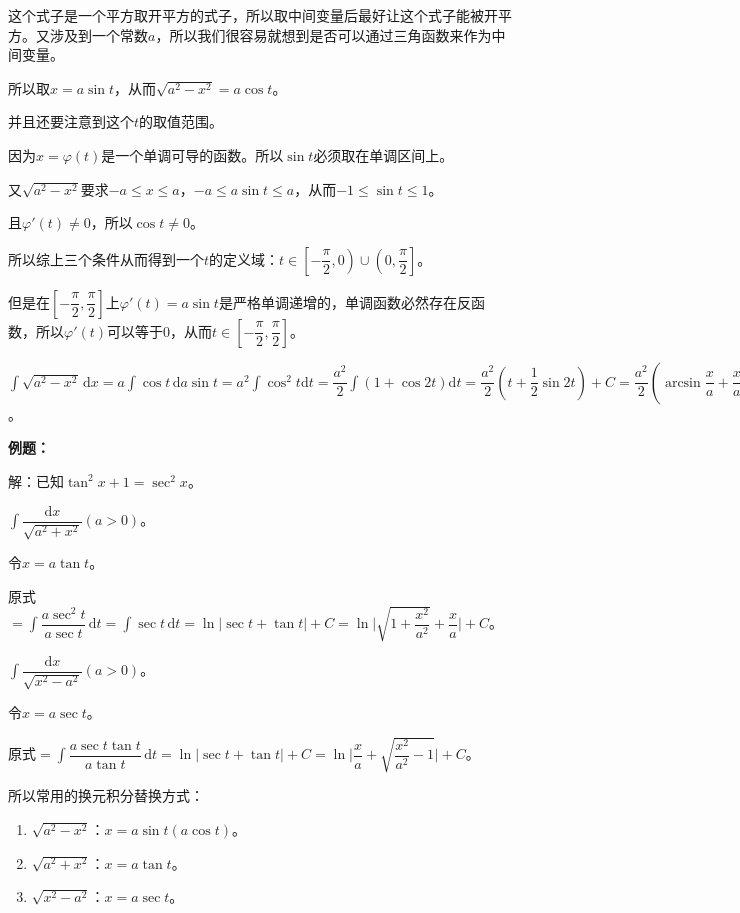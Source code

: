 \documentclass[UTF8, 12pt]{ctexart}
\begin{document}
        这个式子是一个平方取开平方的式子，所以取中间变量后最好让这个式子能被开平方。又涉及到一个常数$a$，所以我们很容易就想到是否可以通过三角函数来作为中间变量。

        所以取$x=a\sin t$，从而$\sqrt{a^2-x^2}=a\cos t$。

        并且还要注意到这个$t$的取值范围。

        因为$x=\varphi(t)$是一个单调可导的函数。所以$\sin t$必须取在单调区间上。

        又$\sqrt{a^2-x^2}$要求$-a\leqslant x\leqslant a$，$-a\leqslant a\sin t\leqslant a$，从而$-1\leqslant\sin t\leqslant 1$。

        且$\varphi'(t)\neq 0$，所以$\cos t\neq 0$。

        所以综上三个条件从而得到一个$t$的定义域：$t\in\left[-\dfrac{\pi}{2},0\right)\cup\left(0,\dfrac{\pi}{2}\right]$。

        但是在$\left[-\dfrac{\pi}{2},\dfrac{\pi}{2}\right]$上$\varphi'(t)=a\sin t$是严格单调递增的，单调函数必然存在反函数，所以$\varphi'(t)$可以等于0，从而$t\in\left[-\dfrac{\pi}{2},\dfrac{\pi}{2}\right]$。

        $\int\sqrt{a^2-x^2}\,\textrm{d}x=a\int\cos t\,\textrm{d}a\sin t=a^2\int\cos^2t\textrm{d}t=\dfrac{a^2}{2}\int(1+\cos 2t)\textrm{d}t=\dfrac{a^2}{2}\left(t+\dfrac{1}{2}\sin 2t\right)+C=\dfrac{a^2}{2}\left(\arcsin\dfrac{x}{a}+\dfrac{x}{a}\sqrt{1-\dfrac{x^2}{a^2}}\right)+C$。

        \textbf{例题：}

        解：已知$\tan^2x+1=\sec^2x$。

        $\displaystyle{\int\dfrac{\textrm{d}x}{\sqrt{a^2+x^2}}}(a>0)$。

        令$x=a\tan t$。

        原式$=\displaystyle{\int\dfrac{a\sec^2t}{a\sec t}\,\textrm{d}t=\int\sec t\,\textrm{d}t}=\ln\vert\sec t+\tan t\vert+C=\ln\bigg\vert\sqrt{1+\dfrac{x^2}{a^2}}+\dfrac{x}{a}\bigg\vert+C$。

        $\displaystyle{\int\dfrac{\textrm{d}x}{\sqrt{x^2-a^2}}}(a>0)$。

        令$x=a\sec t$。

        原式$=\displaystyle{\int\dfrac{a\sec t\tan t}{a\tan t}\,\textrm{d}t}=\ln\bigg\vert\sec t+\tan t\bigg\vert+C=\ln\bigg\vert\dfrac{x}{a}+\sqrt{\dfrac{x^2}{a^2}-1}\vert+C$。\medskip

        所以常用的换元积分替换方式：

        \begin{enumerate}
            \item $\sqrt{a^2-x^2}$：$x=a\sin t(a\cos t)$。
            \item $\sqrt{a^2+x^2}$：$x=a\tan t$。
            \item $\sqrt{x^2-a^2}$：$x=a\sec t$。
        \end{enumerate}
\end{document}
